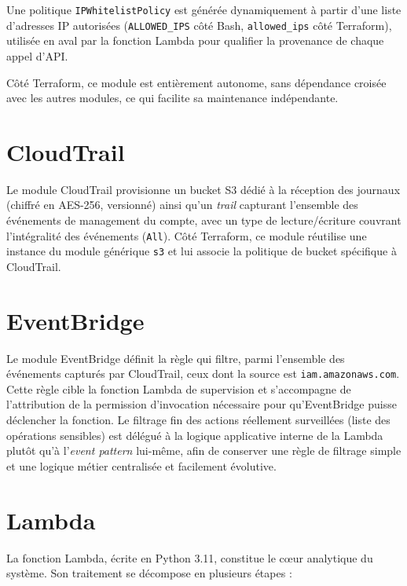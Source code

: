 \documentclass[11pt,a4paper]{report}
\begin{document}
Une politique \texttt{IPWhitelistPolicy} est générée dynamiquement à partir d'une liste d'adresses IP autorisées (\texttt{ALLOWED\_IPS} côté Bash, \texttt{allowed\_ips} côté Terraform), utilisée en aval par la fonction Lambda pour qualifier la provenance de chaque appel d'API.

Côté Terraform, ce module est entièrement autonome, sans dépendance croisée avec les autres modules, ce qui facilite sa maintenance indépendante.

\section{CloudTrail}

Le module CloudTrail provisionne un bucket S3 dédié à la réception des journaux (chiffré en AES-256, versionné) ainsi qu'un \textit{trail} capturant l'ensemble des événements de management du compte, avec un type de lecture/écriture couvrant l'intégralité des événements (\texttt{All}). Côté Terraform, ce module réutilise une instance du module générique \texttt{s3} et lui associe la politique de bucket spécifique à CloudTrail.

\section{EventBridge}

Le module EventBridge définit la règle qui filtre, parmi l'ensemble des événements capturés par CloudTrail, ceux dont la source est \texttt{iam.amazonaws.com}. Cette règle cible la fonction Lambda de supervision et s'accompagne de l'attribution de la permission d'invocation nécessaire pour qu'EventBridge puisse déclencher la fonction. Le filtrage fin des actions réellement surveillées (liste des opérations sensibles) est délégué à la logique applicative interne de la Lambda plutôt qu'à l'\textit{event pattern} lui-même, afin de conserver une règle de filtrage simple et une logique métier centralisée et facilement évolutive.

\section{Lambda}

La fonction Lambda, écrite en Python 3.11, constitue le cœur analytique du système. Son traitement se décompose en plusieurs étapes :
\end{document}
